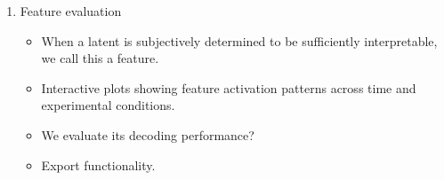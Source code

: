 \begin{enumerate}
    \item Feature evaluation
    \begin{itemize}
        \item When a latent is subjectively determined to be sufficiently interpretable, we call this a feature.
        \item Interactive plots showing feature activation patterns across time and experimental conditions.
        \item We evaluate its decoding performance?
        \item Export functionality.
    \end{itemize}
\end{enumerate}


